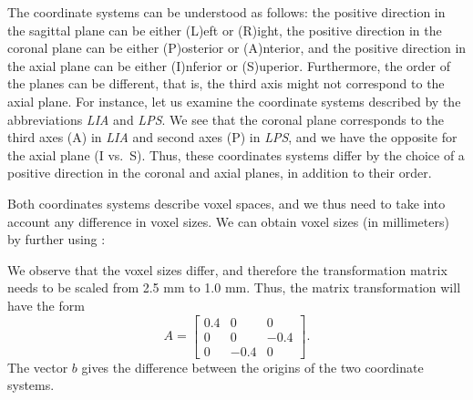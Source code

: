 
The coordinate systems can be understood as follows: the positive
direction in the sagittal plane can be either (L)eft or (R)ight, the
positive direction in the coronal plane can be either (P)osterior or
(A)nterior, and the positive direction in the axial plane can be either
(I)nferior or (S)uperior. Furthermore, the order of the planes can be
different, that is, the third axis might not correspond to the axial
plane. For instance, let us examine the coordinate systems described
by the abbreviations \emph{LIA} and \emph{LPS}. We see that the coronal
plane corresponds to the third axes (A) in \emph{LIA} and second axes
(P) in \emph{LPS}, and we have the opposite for the axial plane (I
vs.~S). Thus, these coordinates systems differ by the choice of a 
positive direction in the coronal and axial planes, in addition to
their order.

Both coordinates systems describe voxel spaces, and we thus need to take into 
account any difference in voxel sizes. We can obtain voxel sizes (in millimeters) 
by further using : 


We observe that the voxel sizes differ, and therefore the transformation matrix 
needs to be scaled from 2.5 mm to 1.0 mm. Thus, the matrix transformation will 
have the form 
\[
A = \left[
\begin{array}{ccc}
0.4 & 0 & 0 \\
0 & 0 & -0.4 \\
0 & -0.4 & 0
\end{array}\right].
\]
The vector $b$ gives the difference between the origins of the two
coordinate systems.

